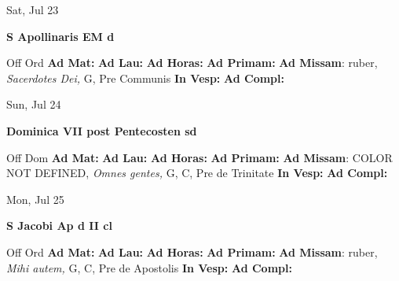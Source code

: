 \documentclass[10pt]{memoir}
\begin{document}
\begin{center}
\begin{minipage}{3.5in}
\vspace{2em}
\begin{center}Sat, Jul 23
\end{center}
\textbf{ \large S Apollinaris EM
\textnormal{\normalsize d}}

\begin{justify}Off Ord
\textbf{Ad Mat: }
\textbf{Ad Lau: }
\textbf{Ad Horas: }
\textbf{Ad Primam: }\textbf{Ad Missam}: ruber, \textit{Sacerdotes Dei,} G, Pre Communis
\textbf{In Vesp: }
\textbf{Ad Compl: }
\end{justify}
\end{minipage}
\end{center}

\begin{center}
\begin{minipage}{3.5in}
\vspace{2em}
\begin{center}Sun, Jul 24
\end{center}
\textbf{ \large Dominica VII post Pentecosten
\textnormal{\normalsize sd}}

\begin{justify}Off Dom
\textbf{Ad Mat: }
\textbf{Ad Lau: }
\textbf{Ad Horas: }
\textbf{Ad Primam: }\textbf{Ad Missam}: COLOR NOT DEFINED, \textit{Omnes gentes,} G, C, Pre de Trinitate
\textbf{In Vesp: }
\textbf{Ad Compl: }
\end{justify}
\end{minipage}
\end{center}

\begin{center}
\begin{minipage}{3.5in}
\vspace{2em}
\begin{center}Mon, Jul 25
\end{center}
\textbf{ \large S Jacobi Ap
\textnormal{\normalsize d II cl}}

\begin{justify}Off Ord
\textbf{Ad Mat: }
\textbf{Ad Lau: }
\textbf{Ad Horas: }
\textbf{Ad Primam: }\textbf{Ad Missam}: ruber, \textit{Mihi autem,} G, C, Pre de Apostolis
\textbf{In Vesp: }
\textbf{Ad Compl: }
\end{justify}
\end{minipage}
\end{center}
\end{document}

